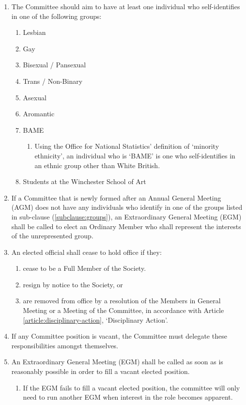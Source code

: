 \documentclass[12pt]{constitution}
\begin{document}
\begin{enumerate}
    \item \label{subclause:groups} The Committee should aim to have at least one individual who self-identifies in one of the following groups: 
    \begin{enumerate}
        \item Lesbian
        \item Gay
        \item Bisexual / Pansexual
        \item Trans / Non-Binary
        \item Asexual
        \item Aromantic
        \item BAME
        \begin{enumerate}
            \item Using the Office for National Statistics' definition of `minority ethnicity', an individual who is `BAME' is one who self-identifies in an ethnic group other than White British.
        \end{enumerate}
        \item Students at the Winchester School of Art
    \end{enumerate}
    
    \item \label{subclause:groups-elect} If a Committee that is newly formed after an Annual General Meeting (AGM) does not have any individuals who identify in one of the groups listed in sub-clause (\ref{subclause:groups}), an Extraordinary General Meeting (EGM) shall be called to elect an Ordinary Member who shall represent the interests of the unrepresented group. 
    
    \item An elected official shall cease to hold office if they:
    \begin{enumerate}
        \item cease to be a Full Member of the Society.
        \item resign by notice to the Society, or
        \item are removed from office by a resolution of the Members in General Meeting or a Meeting of the Committee, in accordance with Article \ref{article:disciplinary-action}, `Disciplinary Action'.
    \end{enumerate}
    
    \item If any Committee position is vacant, the Committee must delegate these responsibilities amongst themselves.
    
    \item An Extraordinary General Meeting (EGM) shall be called as soon as is reasonably possible in order to fill a vacant elected position.
    \begin{enumerate}
        \item If the EGM fails to fill a vacant elected position, the committee will only need to run another EGM when interest in the role becomes apparent.
    \end{enumerate}
\end{enumerate}
\end{document}
